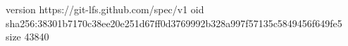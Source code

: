 version https://git-lfs.github.com/spec/v1
oid sha256:38301b7170c38ee20e251d67ff0d3769992b328a997f57135c5849456f649fe5
size 43840
